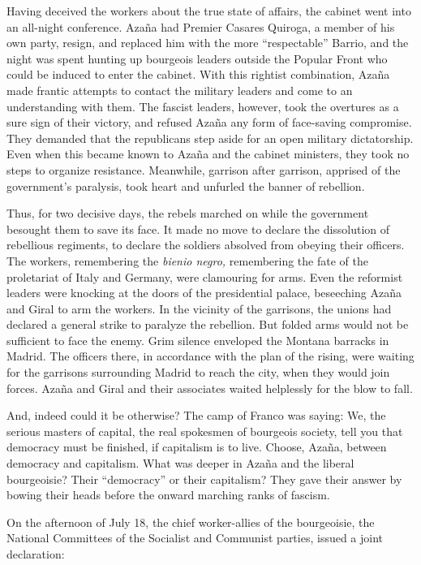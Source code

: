 Having deceived the workers about the true state of affairs, the cabinet went into an all-night conference. Azaña{\indexMAzana} had Premier Ca\-sa\-res Quiroga, a member of his own party, resign, and replaced him with the more ``respectable'' Barrio{\indexDBarrio}, and the night was spent hunting up bourgeois leaders outside the Popular Front who could be induced to enter the cabinet. With this rightist combination, Azaña made frantic attempts to contact the military leaders and come to an understanding with them. The fascist leaders, however, took the overtures as a sure sign of their victory, and refused Azaña any form of face-saving compromise. They demanded that the republicans step aside for an open military dictatorship. Even when this became known to Azaña and the cabinet ministers, they took no steps to organize resistance. Meanwhile, garrison after garrison, apprised of the government’s paralysis, took heart and unfurled the banner of rebellion.

Thus, for two decisive days, the rebels marched on while the government besought them to save its face. It made no move to declare the dissolution of rebellious regiments, to declare the soldiers absolved from obeying their officers. The workers, remembering the \emph{bienio negro,} remembering the fate of the proletariat of Italy and Germany, were clamouring for arms. Even the reformist leaders were knocking at the doors of the presidential palace, beseeching Azaña and Giral to arm the workers. In the vicinity of the garrisons, the unions had declared a general strike to paralyze the rebellion. But folded arms would not be sufficient to face the enemy. Grim silence enveloped the Montana barracks in Madrid. The officers there, in accordance with the plan of the rising, were waiting for the garrisons surrounding Madrid to reach the city, when they would join forces. Azaña and Giral and their associates waited helplessly for the blow to fall.

And, indeed could it be otherwise? The camp of Franco was saying: We, the serious masters of capital, the real spokesmen of bourgeois society, tell you that democracy must be finished, if capitalism is to live. Choose, Azaña, between democracy and capitalism. What was deeper in Azaña and the liberal bourgeoisie? Their ``democracy'' or their capitalism? They gave their answer by bowing their heads before the onward marching ranks of fascism.

On the afternoon of July 18, the chief worker-allies of the bourgeoisie, the National Committees of the Socialist and Communist parties, issued a joint declaration:

